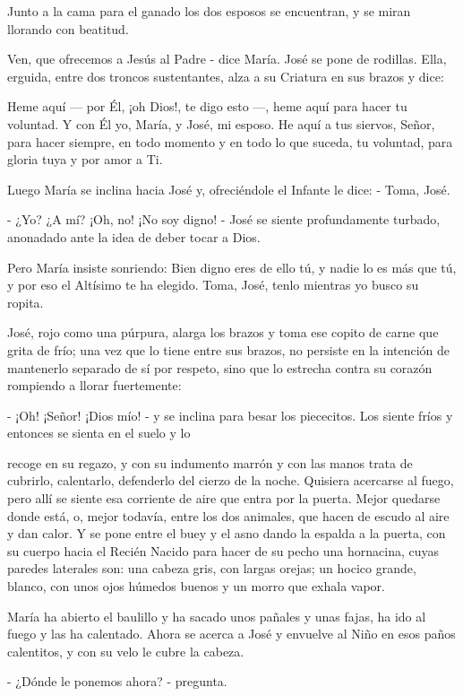 \documentclass[12pt]{book} %
\begin{document}
Junto a la cama para el ganado los dos esposos se encuentran, y se miran llorando con beatitud. 

Ven, que ofrecemos a Jesús al Padre - dice María. José se pone de rodillas. Ella, erguida, entre dos troncos sustentantes, alza a su Criatura en sus brazos y dice: 

Heme aquí — por Él, ¡oh Dios!, te digo esto —, heme aquí para hacer tu voluntad. Y con Él yo, María, y José, mi esposo. He aquí a tus siervos, Señor, para hacer siempre, en todo momento y en todo lo que suceda, tu voluntad, para gloria tuya y por amor a Ti. 

Luego María se inclina hacia José y, ofreciéndole el Infante le dice: - Toma, José. 

- ¿Yo? ¿A mí? ¡Oh, no! ¡No soy digno! - José se siente profundamente turbado, anonadado ante la idea de deber tocar a Dios. 

Pero María insiste sonriendo: Bien digno eres de ello tú, y nadie lo es más que tú, y por eso el Altísimo te ha elegido. Toma, José, tenlo mientras yo busco su ropita. 

José, rojo como una púrpura, alarga los brazos y toma ese copito de carne que grita de frío; una vez que lo tiene entre sus brazos, no persiste en la intención de mantenerlo separado de sí por respeto, sino que lo estrecha contra su corazón rompiendo a llorar fuertemente: 

- ¡Oh! ¡Señor! ¡Dios mío! - y se inclina para besar los piececitos. Los siente fríos y entonces se sienta en el suelo y lo 

recoge en su regazo, y con su indumento marrón y con las manos trata de cubrirlo, calentarlo, defenderlo del cierzo de la noche. Quisiera acercarse al fuego, pero allí se siente esa corriente de aire que entra por la puerta. Mejor quedarse donde está, o, mejor todavía, entre los dos animales, que hacen de escudo al aire y dan calor. Y se pone entre el buey y el asno dando la espalda a la puerta, con su cuerpo hacia el Recién Nacido para hacer de su pecho una hornacina, cuyas paredes laterales son: una cabeza gris, con largas orejas; un hocico grande, blanco, con unos ojos húmedos buenos y un morro que exhala vapor. 

María ha abierto el baulillo y ha sacado unos pañales y unas fajas, ha ido al fuego y las ha calentado. Ahora se acerca a José y envuelve al Niño en esos paños calentitos, y con su velo le cubre la cabeza. 

- ¿Dónde le ponemos ahora? - pregunta. 
\end{document}
